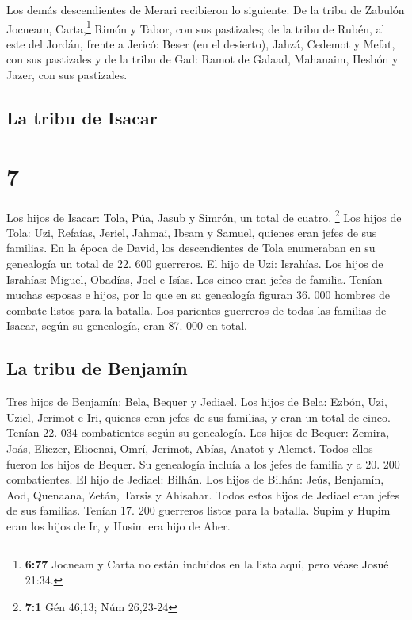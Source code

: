  Los demás descendientes de Merari recibieron lo
siguiente. De la tribu de Zabulón Jocneam, Carta,\footnote{\textbf{6:77}
  Jocneam y Carta no están incluidos en la lista aquí, pero véase Josué
  21:34.} Rimón y Tabor, con sus pastizales;  de la tribu
de Rubén, al este del Jordán, frente a Jericó: Beser (en el desierto),
Jahzá,  Cedemot y Mefat, con sus pastizales
 y de la tribu de Gad: Ramot de Galaad, Mahanaim,
 Hesbón y Jazer, con sus pastizales.

\hypertarget{la-tribu-de-isacar}{%
\subsection{La tribu de Isacar}\label{la-tribu-de-isacar}}

\hypertarget{section-6}{%
\section{7}\label{section-6}}

 Los hijos de Isacar: Tola, Púa, Jasub y Simrón, un total
de cuatro. \footnote{\textbf{7:1} Gén 46,13; Núm 26,23-24}
 Los hijos de Tola: Uzi, Refaías, Jeriel, Jahmai, Ibsam y
Samuel, quienes eran jefes de sus familias. En la época de David, los
descendientes de Tola enumeraban en su genealogía un total de 22. 600
guerreros.  El hijo de Uzi: Israhías. Los hijos de
Israhías: Miguel, Obadías, Joel e Isías. Los cinco eran jefes de
familia.  Tenían muchas esposas e hijos, por lo que en su
genealogía figuran 36. 000 hombres de combate listos para la batalla.
 Los parientes guerreros de todas las familias de Isacar,
según su genealogía, eran 87. 000 en total.

\hypertarget{la-tribu-de-benjamuxedn}{%
\subsection{La tribu de Benjamín}\label{la-tribu-de-benjamuxedn}}

 Tres hijos de Benjamín: Bela, Bequer y Jediael.
 Los hijos de Bela: Ezbón, Uzi, Uziel, Jerimot e Iri,
quienes eran jefes de sus familias, y eran un total de cinco. Tenían 22.
034 combatientes según su genealogía.  Los hijos de
Bequer: Zemira, Joás, Eliezer, Elioenai, Omrí, Jerimot, Abías, Anatot y
Alemet. Todos ellos fueron los hijos de Bequer.  Su
genealogía incluía a los jefes de familia y a 20. 200 combatientes.
 El hijo de Jediael: Bilhán. Los hijos de Bilhán: Jeús,
Benjamín, Aod, Quenaana, Zetán, Tarsis y Ahisahar.  Todos
estos hijos de Jediael eran jefes de sus familias. Tenían 17. 200
guerreros listos para la batalla.  Supim y Hupim eran los
hijos de Ir, y Husim era hijo de Aher.

